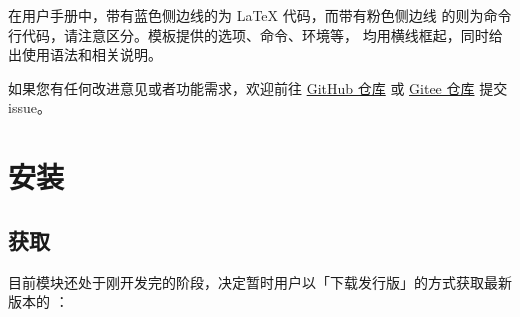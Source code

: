 \documentclass{ccnudoc}
\begin{document}
在用户手册中，带有蓝色侧边线的为 \LaTeX{} 代码，而带有粉色侧边线
的则为命令行代码，请注意区分。模板提供的选项、命令、环境等，
均用横线框起，同时给出使用语法和相关说明。


如果您有任何改进意见或者功能需求，欢迎前往 \href{https://github.com/xkwxdyy/CCNUthesis/issues}{GitHub 仓库} 或 \href{https://gitee.com/xkwxdyy/CCNUthesis/issues}{Gitee 仓库} 提交 issue。



\section{安装}

\subsection{获取 }

目前模块还处于刚开发完的阶段，决定暂时用户以「下载发行版」的方式获取最新版本的 ：
\end{document}
